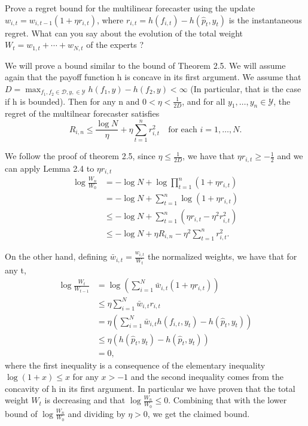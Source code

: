 \begin{exercise}[]{}
	Prove a regret bound for the multilinear forecaster using the update $ w_{i,t} = w_{i,t-1}(1+\eta r_{i,t}) $, where $ r_{i,t} = h(f_{i,t}) - h(\hat{p}_t,y_t) $ is the instantaneous regret. What can you say about the evolution of the total weight $ W_t = w_{1,t} + \cdots + w_{N,t} $ of the experts ?
\end{exercise}

\begin{solution}[]
We will prove a bound similar to the bound of Theorem 2.5. We will assume again that the payoff function h is concave in its first argument. We assume that $ D = \max_{f_1, f_2\in \mathcal{D}, y, \in \mathcal{Y}}h(f_1,y) - h(f_2,y) <\infty $ (In particular, that is the case if h is bounded). Then for any n and $ 0<\eta< \frac{1}{2D} $, and for all $ y_1,\ldots,y_n \in \mathcal{Y}$, the regret of the multilnear forecaster satisfies
\begin{equation*}
	R_{i,n} \leq \frac{\log N}{\eta} + \eta \sum_{t=1}^{n}r_{i,t}^2 \quad  \text{for each } i=1,\ldots,N.
\end{equation*}

We follow the proof of theorem 2.5, since $ \eta \leq \frac{1}{2D} $, we have that $ \eta r_{i,t} \geq -\frac{1}{2} $ and we can apply Lemma 2.4 to $ \eta r_{i,t} $
\begin{align*}
	\log \frac{W_n}{W_0} &= - \log N + \log \prod_{t=1}^n(1+ \eta r_{i,t})\\
			     &= - \log N + \sum_{t=1}^{n} \log(1 + \eta r_{i,t}) \\
			     &\leq -\log N + \sum_{t=1}^{n}(\eta r_{i,t} - \eta^2 r_{i,t}^2) \\
			     &\leq -\log N + \eta R_{i,n} -\eta^2 \sum_{t=1}^{n}r_{i,t}^2.
\end{align*}

On the other hand, defining $ \bar{w}_{i,t} = \frac{w_{i,t}}{W_t} $ the normalized weights, we have that for any t,
\begin{align*}
	\log \frac{W_t}{W_{t-1}} &= \log \left( \sum_{i=1}^{N}\bar{w}_{i,t}(1+ \eta r_{i,t}) \right) \\
				 &\leq  \eta \sum_{i=1}^{N}\bar{w}_{i,t}r_{i,t}\\
				 &=\eta(\sum_{i=1}^{N}\bar{w}_{i,t}h(f_{i,t},y_t) - h(\hat{p}_t,y_t))\\
				 &\leq \eta(h(\hat{p}_t,y_t) - h(\hat{p}_t,y_t))\\
				 &= 0,
\end{align*}
where the first inequality is a consequence of the elementary inequality $ \log(1+x) \leq x $ for any $ x>-1 $ and the second inequality comes from the concavity of h in its first argument. In particular we have proven that the total weight $ W_t $ is decreasing and that $ \log \frac{W_n}{W_0} \leq 0 $. Combining that with the lower bound of $ \log \frac{W_n}{W_0} $ and dividing by $ \eta >0 $, we get the claimed bound.
\end{solution}
